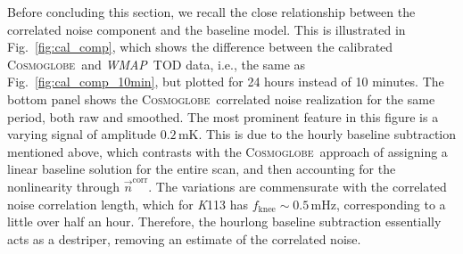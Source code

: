 \documentclass[twocolumn]{../../common/aa}
\def\WMAP{\emph{WMAP}}
\def\Planck{\emph{Planck}}
\newcommand{\n}[0]{\vec{n}}
\newcommand{\cosmoglobe}{\textsc{Cosmoglobe}}
\newcommand{\K}[0]{\textit K}
\newcommand{\Ka}[0]{\textit{Ka}}
\begin{document}
Before concluding this section, we recall the close relationship between the correlated noise component and the baseline model. This is illustrated in Fig.~\ref{fig:cal_comp}, which shows the difference between the calibrated \cosmoglobe\ and \WMAP\ TOD data, i.e., the same as Fig.~\ref{fig:cal_comp_10min}, but plotted for 24 hours instead of 10 minutes. The bottom panel shows the \cosmoglobe\ correlated noise realization for the same period, both raw and smoothed. The most prominent feature in this figure is a varying signal of amplitude $0.2\,\mathrm{mK}$. This is due to the hourly baseline subtraction mentioned above, which contrasts with the \cosmoglobe\ approach of assigning a linear baseline solution for the entire scan, and then accounting for the nonlinearity through $\n^{\mathrm{corr}}$. The variations are commensurate with the correlated noise correlation length, which for \K113 has ${f_\mathrm{knee}\sim0.5\,\mathrm{mHz}}$, corresponding to a little over half an hour. Therefore, the hourlong baseline subtraction essentially acts as a destriper, removing an estimate of the correlated noise. 










%






\end{document}
